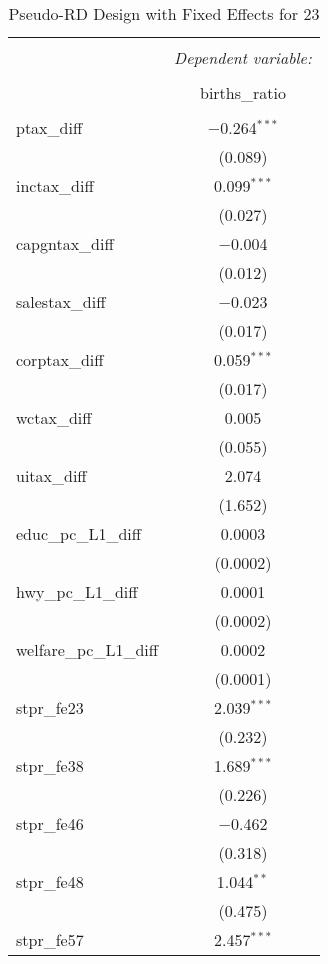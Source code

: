 
\begin{table}[!htbp] \centering 
  \caption{Pseudo-RD Design with Fixed Effects for  23} 
  \label{} 
\begin{tabular}{@{\extracolsep{5pt}}lc} 
\\[-1.8ex]\hline 
\hline \\[-1.8ex] 
 & \multicolumn{1}{c}{\textit{Dependent variable:}} \\ 
\cline{2-2} 
\\[-1.8ex] & births\_ratio \\ 
\hline \\[-1.8ex] 
 ptax\_diff & $-$0.264$^{***}$ \\ 
  & (0.089) \\ 
  inctax\_diff & 0.099$^{***}$ \\ 
  & (0.027) \\ 
  capgntax\_diff & $-$0.004 \\ 
  & (0.012) \\ 
  salestax\_diff & $-$0.023 \\ 
  & (0.017) \\ 
  corptax\_diff & 0.059$^{***}$ \\ 
  & (0.017) \\ 
  wctax\_diff & 0.005 \\ 
  & (0.055) \\ 
  uitax\_diff & 2.074 \\ 
  & (1.652) \\ 
  educ\_pc\_L1\_diff & 0.0003 \\ 
  & (0.0002) \\ 
  hwy\_pc\_L1\_diff & 0.0001 \\ 
  & (0.0002) \\ 
  welfare\_pc\_L1\_diff & 0.0002 \\ 
  & (0.0001) \\ 
  stpr\_fe23 & 2.039$^{***}$ \\ 
  & (0.232) \\ 
  stpr\_fe38 & 1.689$^{***}$ \\ 
  & (0.226) \\ 
  stpr\_fe46 & $-$0.462 \\ 
  & (0.318) \\ 
  stpr\_fe48 & 1.044$^{**}$ \\ 
  & (0.475) \\ 
  stpr\_fe57 & 2.457$^{***}$ \\ 

\end{tabular}
\end{table}
